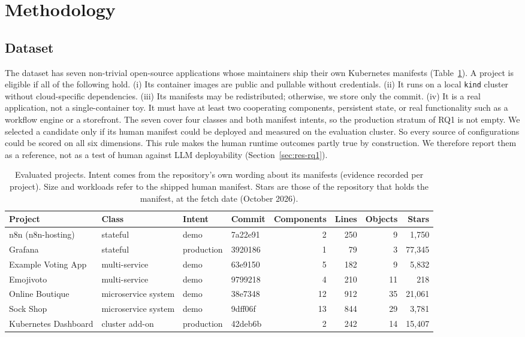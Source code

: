 \section{Methodology}\label{sec:methodology}

\subsection{Dataset}\label{sec:method-dataset}

The dataset has seven non-trivial open-source applications whose maintainers ship their own Kubernetes manifests (Table~\ref{tab:dataset}). A project is eligible if all of the following hold. (i) Its container images are public and pullable without credentials. (ii) It runs on a local \texttt{kind} cluster \citep{tool_kind} without cloud-specific dependencies. (iii) Its manifests may be redistributed; otherwise, we store only the commit. (iv) It is a real application, not a single-container toy. It must have at least two cooperating components, persistent state, or real functionality such as a workflow engine or a storefront. The seven cover four classes and both manifest intents, so the production stratum of RQ1 is not empty. We selected a candidate only if its human manifest could be deployed and measured on the evaluation cluster. So every source of configurations could be scored on all six dimensions. This rule makes the human runtime outcomes partly true by construction. We therefore report them as a reference, not as a test of human against LLM deployability (Section~\ref{sec:res-rq1}).

\begin{table}[t]
\centering\small
\caption{Evaluated projects. Intent comes from the repository's own wording about its manifests (evidence recorded per project). Size and workloads refer to the shipped human manifest. Stars are those of the repository that holds the manifest, at the fetch date (October 2026).}\label{tab:dataset}
\begin{tabular}{llllrrrr}
\toprule
Project & Class & Intent & Commit & Components & Lines & Objects & Stars \\ \midrule
n8n (n8n-hosting) & stateful & demo & 7a22e91 & 2 & 250 & 9 & 1,750 \\
Grafana & stateful & production & 3920186 & 1 & 79 & 3 & 77,345 \\
Example Voting App & multi-service & demo & 63e9150 & 5 & 182 & 9 & 5,832 \\
Emojivoto & multi-service & demo & 9799218 & 4 & 210 & 11 & 218 \\
Online Boutique & microservice system & demo & 38e7348 & 12 & 912 & 35 & 21,061 \\
Sock Shop & microservice system & demo & 9dff06f & 13 & 844 & 29 & 3,781 \\
Kubernetes Dashboard & cluster add-on & production & 42deb6b & 2 & 242 & 14 & 15,407 \\
\bottomrule
\end{tabular}
\end{table}


